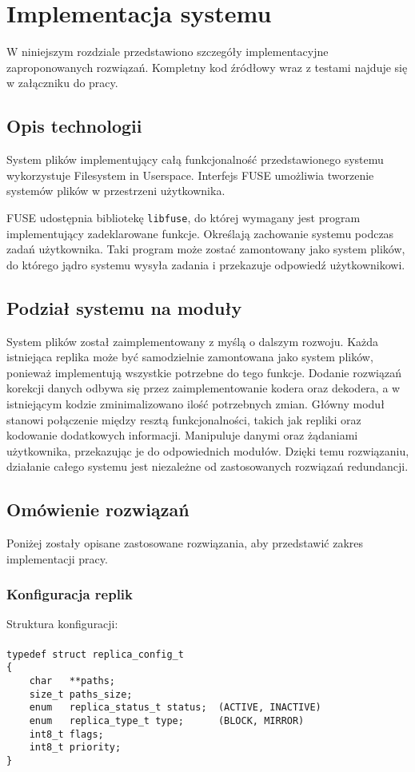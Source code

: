 \chapter{Implementacja systemu}
\thispagestyle{chapterBeginStyle}
W niniejszym rozdziale przedstawiono szczegóły implementacyjne zaproponowanych rozwiązań. Kompletny kod źródłowy wraz z testami najduje się w załączniku do pracy.

\section{Opis technologii}

System plików implementujący całą funkcjonalność przedstawionego systemu wykorzystuje Filesystem in Userspace. Interfejs FUSE umożliwia tworzenie systemów plików w przestrzeni użytkownika. 

FUSE udostępnia bibliotekę \verb|libfuse|, do której wymagany jest program implementujący zadeklarowane funkcje. Określają zachowanie systemu podczas zadań użytkownika. Taki program może zostać zamontowany jako system plików, do którego jądro systemu wysyła zadania i przekazuje odpowiedź użytkownikowi.

\section{Podział systemu na moduły}
System plików został zaimplementowany z myślą o dalszym rozwoju. Każda istniejąca replika może być samodzielnie zamontowana jako system plików, ponieważ implementują wszystkie potrzebne do tego funkcje. Dodanie rozwiązań korekcji danych odbywa się przez zaimplementowanie kodera oraz dekodera, a w istniejącym kodzie zminimalizowano ilość potrzebnych zmian. Główny moduł stanowi połączenie między resztą funkcjonalności, takich jak repliki oraz kodowanie dodatkowych informacji. Manipuluje danymi oraz żądaniami użytkownika, przekazując je do odpowiednich modułów. Dzięki temu rozwiązaniu, działanie całego systemu jest niezależne od zastosowanych rozwiązań redundancji.

\section{Omówienie rozwiązań}
Poniżej zostały opisane zastosowane rozwiązania, aby przedstawić zakres implementacji pracy.
\subsection {Konfiguracja replik}
Struktura konfiguracji:\\\\
\verb|typedef struct replica_config_t| \\
\verb|{| \\
\verb|    char   **paths;|\\
\verb|    size_t paths_size;|\\
\verb|    enum   replica_status_t status;  (ACTIVE, INACTIVE)|\\
\verb|    enum   replica_type_t type;      (BLOCK, MIRROR)| \\
\verb|    int8_t flags;| \\
\verb|    int8_t priority;|\\
\verb|}|

